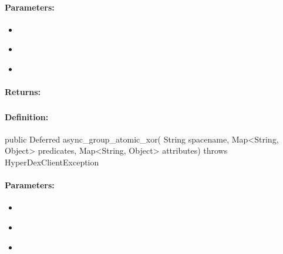 \paragraph{Parameters:}
\begin{itemize}[noitemsep]
\item {}\\

\item {}\\

\item {}\\

\end{itemize}

\paragraph{Returns:}


\pagebreak
\subsubsection{}
\label{api:java:async_group_atomic_xor}


\paragraph{Definition:}
\begin{javacode}
public Deferred async_group_atomic_xor(
        String spacename,
        Map<String, Object> predicates,
        Map<String, Object> attributes) throws HyperDexClientException
\end{javacode}

\paragraph{Parameters:}
\begin{itemize}[noitemsep]
\item {}\\

\item {}\\

\item {}\\

\end{itemize}

